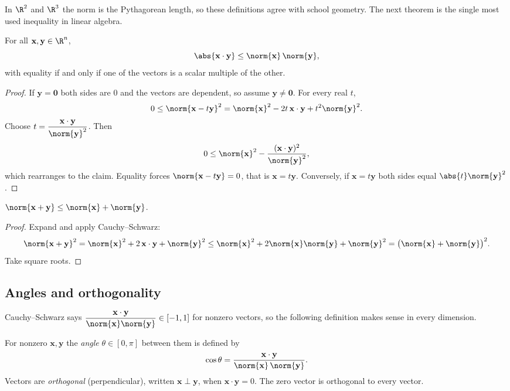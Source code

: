 In $\R^2$ and $\R^3$ the norm is the Pythagorean length, so these definitions agree with school geometry. The next theorem is the single most used inequality in linear algebra.

\begin{theorem}\label{thm:cs}
For all $\mathbf{x},\mathbf{y}\in\R^n$,
\[ \abs{\mathbf{x}\cdot\mathbf{y}}\le\norm{\mathbf{x}}\,\norm{\mathbf{y}}, \]
with equality if and only if one of the vectors is a scalar multiple of the other.
\end{theorem}

\begin{proof}
If $\mathbf{y}=\mathbf{0}$ both sides are $0$ and the vectors are dependent, so assume $\mathbf{y}\ne\mathbf{0}$. For every real $t$,
\[ 0\le\norm{\mathbf{x}-t\mathbf{y}}^2=\norm{\mathbf{x}}^2-2t\,\mathbf{x}\cdot\mathbf{y}+t^2\norm{\mathbf{y}}^2. \]
Choose $t=\dfrac{\mathbf{x}\cdot\mathbf{y}}{\norm{\mathbf{y}}^2}$. Then
\[ 0\le\norm{\mathbf{x}}^2-\frac{(\mathbf{x}\cdot\mathbf{y})^2}{\norm{\mathbf{y}}^2}, \]
which rearranges to the claim. Equality forces $\norm{\mathbf{x}-t\mathbf{y}}=0$, that is $\mathbf{x}=t\mathbf{y}$. Conversely, if $\mathbf{x}=t\mathbf{y}$ both sides equal $\abs{t}\norm{\mathbf{y}}^2$.
\end{proof}

\begin{corollary}\label{cor:tri}
$\norm{\mathbf{x}+\mathbf{y}}\le\norm{\mathbf{x}}+\norm{\mathbf{y}}$.
\end{corollary}

\begin{proof}
Expand and apply Cauchy--Schwarz:
\[ \norm{\mathbf{x}+\mathbf{y}}^2=\norm{\mathbf{x}}^2+2\,\mathbf{x}\cdot\mathbf{y}+\norm{\mathbf{y}}^2\le\norm{\mathbf{x}}^2+2\norm{\mathbf{x}}\norm{\mathbf{y}}+\norm{\mathbf{y}}^2=\big(\norm{\mathbf{x}}+\norm{\mathbf{y}}\big)^2. \]
Take square roots.
\end{proof}

\subsection*{Angles and orthogonality}

Cauchy--Schwarz says $\dfrac{\mathbf{x}\cdot\mathbf{y}}{\norm{\mathbf{x}}\norm{\mathbf{y}}}\in[-1,1]$ for nonzero vectors, so the following definition makes sense in every dimension.

\begin{definition}
For nonzero $\mathbf{x},\mathbf{y}$ the \emph{angle} $\theta\in[0,\pi]$ between them is defined by
\[ \cos\theta=\frac{\mathbf{x}\cdot\mathbf{y}}{\norm{\mathbf{x}}\,\norm{\mathbf{y}}}. \]
Vectors are \emph{orthogonal} (perpendicular), written $\mathbf{x}\perp\mathbf{y}$, when $\mathbf{x}\cdot\mathbf{y}=0$. The zero vector is orthogonal to every vector.
\end{definition}

